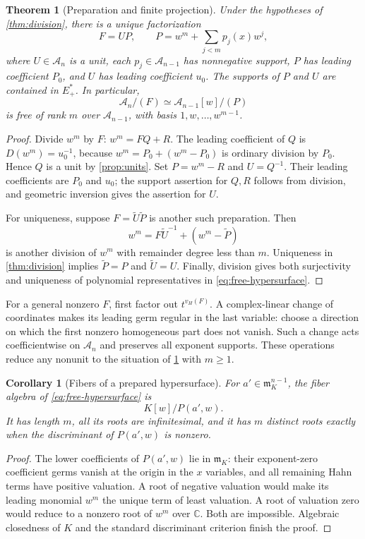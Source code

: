 \documentclass[11pt,letterpaper]{article}
\newtheorem{theorem}{Theorem}[section]
\newtheorem{corollary}[corollary]{Corollary}
\theoremstyle{definition}
\theoremstyle{remark}
\newcommand{\C}{\mathbb C}
\newcommand{\A}{\mathscr A}
\newcommand{\m}{\mathfrak m}
\newcommand{\vH}{v_{\!H}}
\numberwithin{equation}{section}
\begin{document}
\begin{theorem}[Preparation and finite projection]\label{thm:prep}
Under the hypotheses of \cref{thm:division}, there is a unique factorization
\begin{equation}\label{eq:prep}
 F=UP,
 \qquad P=w^m+\sum_{j<m}p_j(x)w^j,
\end{equation}
where $U\in\A_n$ is a unit, each $p_j\in\A_{n-1}$ has nonnegative support, $P$ has leading coefficient $P_0$, and $U$ has leading coefficient $u_0$. The supports of $P$ and $U$ are contained in $E_+^*$. In particular,
\begin{equation}\label{eq:free-hypersurface}
 \A_n/(F)\simeq\A_{n-1}[w]/(P)
\end{equation}
is free of rank $m$ over $\A_{n-1}$, with basis $1,w,\ldots,w^{m-1}$.
\end{theorem}
\begin{proof}
Divide $w^m$ by $F$: $w^m=FQ+R$. The leading coefficient of $Q$ is $D(w^m)=u_0^{-1}$, because $w^m=P_0+(w^m-P_0)$ is ordinary division by $P_0$. Hence $Q$ is a unit by \cref{prop:units}. Set $P=w^m-R$ and $U=Q^{-1}$. Their leading coefficients are $P_0$ and $u_0$; the support assertion for $Q,R$ follows from division, and geometric inversion gives the assertion for $U$.

For uniqueness, suppose $F=\widetilde U\widetilde P$ is another such preparation. Then
\[
 w^m=F\widetilde U^{-1}+(w^m-\widetilde P)
\]
is another division of $w^m$ with remainder degree less than $m$. Uniqueness in \cref{thm:division} implies $\widetilde P=P$ and $\widetilde U=U$. Finally, division gives both surjectivity and uniqueness of polynomial representatives in \eqref{eq:free-hypersurface}.
\end{proof}

For a general nonzero $F$, first factor out $t^{\vH(F)}$. A complex-linear change of coordinates makes its leading germ regular in the last variable: choose a direction on which the first nonzero homogeneous part does not vanish. Such a change acts coefficientwise on $\A_n$ and preserves all exponent supports. These operations reduce any nonunit to the situation of \cref{thm:prep} with $m\ge1$.

\begin{corollary}[Fibers of a prepared hypersurface]\label{cor:hypersurface-fiber}
For $a'\in\m_K^{n-1}$, the fiber algebra of \eqref{eq:free-hypersurface} is
\[
 K[w]/P(a',w).
\]
It has length $m$, all its roots are infinitesimal, and it has $m$ distinct roots exactly when the discriminant of $P(a',w)$ is nonzero.
\end{corollary}
\begin{proof}
The lower coefficients of $P(a',w)$ lie in $\m_K$: their exponent-zero coefficient germs vanish at the origin in the $x$ variables, and all remaining Hahn terms have positive valuation. A root of negative valuation would make its leading monomial $w^m$ the unique term of least valuation. A root of valuation zero would reduce to a nonzero root of $w^m$ over $\C$. Both are impossible. Algebraic closedness of $K$ and the standard discriminant criterion finish the proof.
\end{proof}
\end{document}
